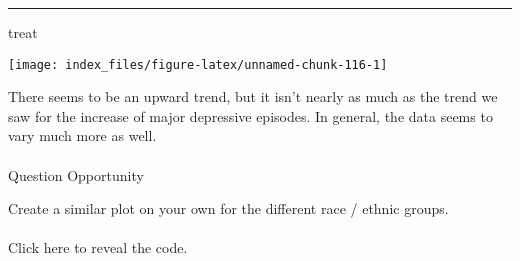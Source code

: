 \documentclass[
]{article}
\newenvironment{Shaded}{\begin{snugshade}}{\end{snugshade}}
\newcommand{\NormalTok}[1]{#1}
\begin{document}
\begin{center}\rule{0.5\linewidth}{0.5pt}\end{center}

\begin{Shaded}
\begin{Highlighting}[]
\NormalTok{treat}
\end{Highlighting}
\end{Shaded}

\begin{center}\texttt{[image: index\_files/figure-latex/unnamed-chunk-116-1]} \end{center}

There seems to be an upward trend, but it isn't nearly as much as the
trend we saw for the increase of major depressive episodes. In general,
the data seems to vary much more as well.

\hypertarget{section-34}{%
\paragraph{}\label{section-34}}

Question Opportunity

Create a similar plot on your own for the different race / ethnic
groups.

\hypertarget{section-35}{%
\paragraph{}\label{section-35}}

Click here to reveal the code.
\end{document}
